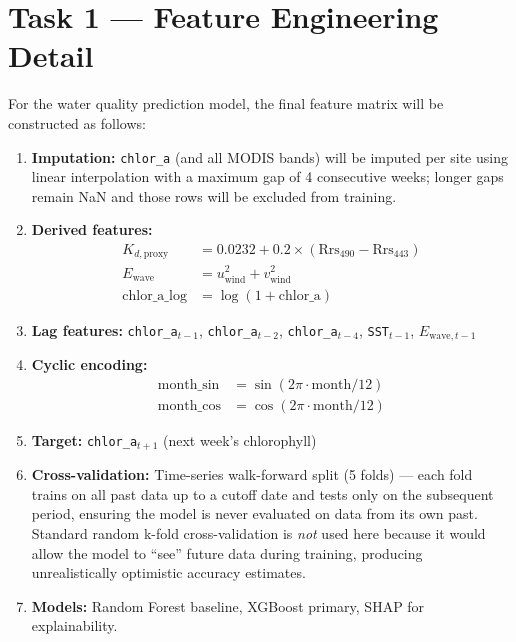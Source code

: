 \documentclass[12pt,a4paper]{report}
\begin{document}
\section{Task 1 — Feature Engineering Detail}

For the water quality prediction model, the final feature matrix will be constructed as
follows:

\begin{enumerate}[leftmargin=*]
  \item \textbf{Imputation:} \texttt{chlor\_a} (and all MODIS bands) will be imputed per
    site using linear interpolation with a maximum gap of 4 consecutive weeks; longer gaps
    remain NaN and those rows will be excluded from training.
  \item \textbf{Derived features:}
    \begin{align}
      K_{d,\text{proxy}} &= 0.0232 + 0.2 \times (\text{Rrs}_{490} - \text{Rrs}_{443}) \\
      E_{\text{wave}} &= u_{\text{wind}}^2 + v_{\text{wind}}^2 \\
      \text{chlor\_a\_log} &= \log(1 + \text{chlor\_a})
    \end{align}
  \item \textbf{Lag features:} \texttt{chlor\_a}$_{t-1}$, \texttt{chlor\_a}$_{t-2}$,
    \texttt{chlor\_a}$_{t-4}$, \texttt{SST}$_{t-1}$, $E_{\text{wave},t-1}$
  \item \textbf{Cyclic encoding:}
    \begin{align}
      \text{month\_sin} &= \sin(2\pi \cdot \text{month}/12) \\
      \text{month\_cos} &= \cos(2\pi \cdot \text{month}/12)
    \end{align}
  \item \textbf{Target:} \texttt{chlor\_a}$_{t+1}$ (next week's chlorophyll)
  \item \textbf{Cross-validation:} Time-series walk-forward split (5 folds) — each
    fold trains on all past data up to a cutoff date and tests only on the subsequent
    period, ensuring the model is never evaluated on data from its own past.
    Standard random k-fold cross-validation is \textit{not} used here because
    it would allow the model to ``see'' future data during training, producing
    unrealistically optimistic accuracy estimates.
  \item \textbf{Models:} Random Forest baseline, XGBoost primary, SHAP for explainability.
\end{enumerate}
\end{document}
